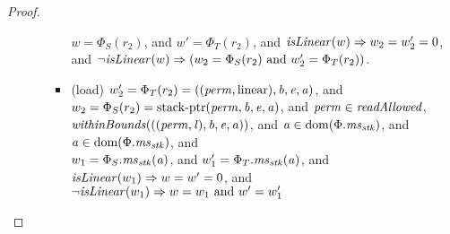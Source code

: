 \begin{proof}
\begin{itemize}
\begin{itemize}
\begin{itemize}
      $w = \Phi_S(r_2)$, and $w' = \Phi_T(r_2)$, and $\isLinear{w} \Rightarrow
      w_2 = w_2' = 0$, and $\neg \isLinear{w} \Rightarrow (w_2 = \Phi_S(r_2)
      \text{ and } w_2' = \Phi_T(r_2))$.
    \item (load) $ w_2' = \Phi_T(r_2) =
      ((\mathit{perm},\mathrm{linear}),\mathit{b},\mathit{e},\mathit{a})$, and $w_2 = \Phi_S(r_2) = \mathrm{stack\text{-}ptr}(\mathit{perm},\mathit{b},\mathit{e},\mathit{a})$, and $\perm \in \readAllowed{}$,
      $\withinBounds{((\perm,\lin),\baddr,\eaddr,\aaddr)}$, and $\mathit{a} \in
      \mathrm{dom}(\Phi.\mathit{ms}_{\mathit{stk}})$, and $\mathit{a} \in \mathrm{dom}(\Phi.\mathit{ms}_{\mathit{stk}})$, and\\
      $w_1 = \Phi_S.\mathit{ms}_{\mathit{stk}}(\mathit{a})$, and $w_1' = \Phi_T.\mathit{ms}_{\mathit{stk}}(\mathit{a})$, and \\
      $\isLinear{w_1} \Rightarrow w = w' = 0$, and \\
      $\neg \isLinear{w_1} \Rightarrow w = w_1 \text{ and } w' = w_1'$
    \end{itemize}
  \end{itemize}


\end{itemize}
\end{proof}
